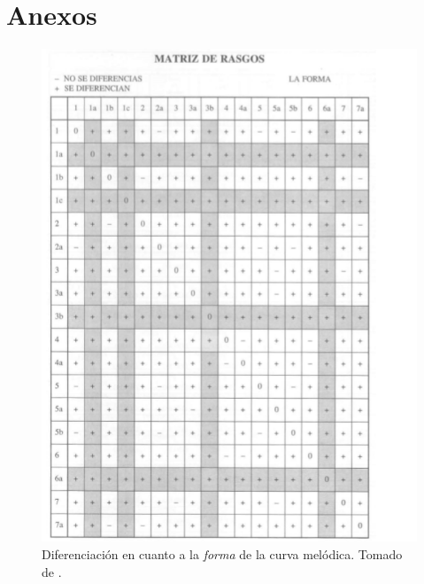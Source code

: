 \chapter*{Anexos}

\begin{figure}
\begin{center}
\includegraphics[width= 0.7\columnwidth]{Graphics/rasgos_forma}
\caption{Diferenciaci\'on en cuanto a la \emph{forma} de la curva mel\'odica. Tomado de \cite[p.220]{garcia1996aspectos2}.}
\label{rasgos_forma}
\end{center}
\end{figure}


